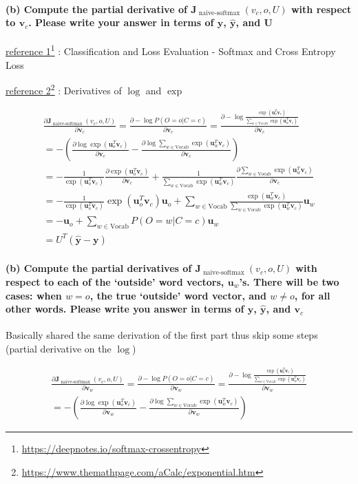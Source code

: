\documentclass[12pt, letterpaper]{article}
\newcommand{\fnurl}[2]{
  \href{#2}{#1}\footnote{\url{#2}}
}
\newcommand{\uxvc}[1]{\boldsymbol{u}_{#1}^{T} \boldsymbol{v}_{c}}
\newcommand{\expuxvc}[1]{\exp {\left(\uxvc{#1}\right)}}
\newcommand{\softmax}{\frac{\expuxvc{o}}{\sum_{w \in \mathrm{Vocab}} \expuxvc{w}}}
\newcommand{\Jsoftmax}{\boldsymbol{J}_{\text { naive-softmax }}\left(v_{c}, o, U\right)} %
\newcommand{\loss}{-\log P(O=o | C=c)}
\newcommand{\partialD}[2]{\frac{\partial #1}{\partial #2}}
\begin{document}
\paragraph{(b) Compute the partial derivative of $\Jsoftmax$ with respect to $\boldsymbol{v}_{c}$. Please write your
answer in terms of $\boldsymbol{y}$, $\hat{\boldsymbol{y}}$, and $\boldsymbol{U}$}

\fnurl{reference 1}{https://deepnotes.io/softmax-crossentropy}: Classification and Loss Evaluation - Softmax and Cross Entropy Loss

\fnurl{reference 2}{https://www.themathpage.com/aCalc/exponential.htm}: Derivatives of $\log$ and $\exp$

\begin{align*}
    \partialD{\Jsoftmax}{\boldsymbol{v}_{c}} = \partialD{\loss}{\boldsymbol{v}_{c}} = \partialD{-\log \softmax}{\boldsymbol{v}_{c}} \\
    = -(\partialD{\log\expuxvc{o}}{\boldsymbol{v}_{c}} - \partialD{\log\sum_{w \in \mathrm{Vocab}} \expuxvc{w}}{\boldsymbol{v}_{c}}) \\
    = -\frac{1}{\expuxvc{o}}\partialD{\expuxvc{o}}{\boldsymbol{v}_{c}} + \frac{1}{\sum_{w \in \mathrm{Vocab}} \expuxvc{w}}\partialD{\sum_{w \in \mathrm{Vocab}} \expuxvc{w}}{\boldsymbol{v}_{c}} \\
    = -\frac{1}{\expuxvc{o}}\expuxvc{o}\boldsymbol{u}_o + \sum_{w \in \mathrm{Vocab}} \frac{\expuxvc{w}}{\sum_{w \in \mathrm{Vocab}} \expuxvc{w}} \boldsymbol{u}_w \\
    = -\boldsymbol{u}_o + \sum_{w \in \mathrm{Vocab}} P(O=w|C=c) \boldsymbol{u}_w \\
    = U^T (\hat{\boldsymbol{y}} - \boldsymbol{y})
\end{align*}


\paragraph{(b) Compute the partial derivatives of $\Jsoftmax$ with respect to each of the ‘outside’ word vectors, $\boldsymbol{u}_w$'s. There will be two cases: when $w = o$, the true ‘outside’ word vector, and $w \neq o$, for all other words. Please write you answer in terms of $\boldsymbol{y}$, $\hat{\boldsymbol{y}}$, and $\boldsymbol{v}_c$}

Basically shared the same derivation of the first part thus skip some steps (partial derivative on the $\log$)

\begin{align*} %
    \partialD{\Jsoftmax}{\boldsymbol{v}_{w}} = \partialD{\loss}{\boldsymbol{v}_{w}} = \partialD{-\log \softmax}{\boldsymbol{v}_{w}} \\
    = -(\partialD{\log\expuxvc{o}}{\boldsymbol{v}_{w}} - \partialD{\log\sum_{w \in \mathrm{Vocab}} \expuxvc{w}}{\boldsymbol{v}_{w}})
\end{align*}
\end{document}
